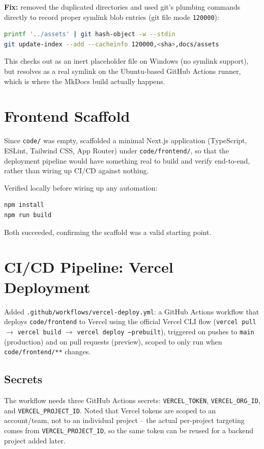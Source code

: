 \documentclass[11pt,a4paper]{article}
\begin{document}
\textbf{Fix:} removed the duplicated directories and used
git's plumbing commands directly to record proper symlink
blob entries (git file mode \texttt{120000}):

\begin{lstlisting}[language=bash]
printf '../assets' | git hash-object -w --stdin
git update-index --add --cacheinfo 120000,<sha>,docs/assets
\end{lstlisting}

This checks out as an inert placeholder file on Windows
(no symlink support), but resolves as a real symlink on
the Ubuntu-based GitHub Actions runner, which is where the
MkDocs build actually happens.

\section{Frontend Scaffold}
Since \texttt{code/} was empty, scaffolded a minimal
Next.js application (TypeScript, ESLint, Tailwind CSS,
App Router) under \texttt{code/frontend/}, so that the
deployment pipeline would have something real to build and
verify end-to-end, rather than wiring up CI/CD against
nothing.

Verified locally before wiring up any automation:
\begin{lstlisting}[language=bash]
npm install
npm run build
\end{lstlisting}
Both succeeded, confirming the scaffold was a valid
starting point.

\section{CI/CD Pipeline: Vercel Deployment}
Added \texttt{.github/workflows/vercel-deploy.yml}: a
GitHub Actions workflow that deploys \texttt{code/frontend}
to Vercel using the official Vercel CLI flow
(\texttt{vercel pull} $\to$ \texttt{vercel build} $\to$
\texttt{vercel deploy --prebuilt}), triggered on pushes to
\texttt{main} (production) and on pull requests (preview),
scoped to only run when \texttt{code/frontend/**} changes.

\subsection{Secrets}
The workflow needs three GitHub Actions secrets:
\texttt{VERCEL\_TOKEN}, \texttt{VERCEL\_ORG\_ID}, and
\texttt{VERCEL\_PROJECT\_ID}. Noted that Vercel tokens are
scoped to an account/team, not to an individual project --
the actual per-project targeting comes from
\texttt{VERCEL\_PROJECT\_ID}, so the same token can be
reused for a backend project added later.
\end{document}
